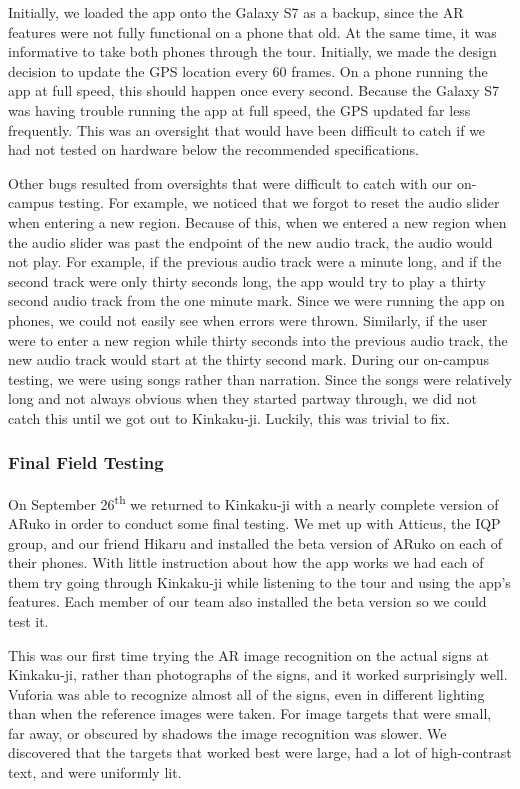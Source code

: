 \documentclass[a4paper, 10pt, american, titlepage]{article}
\begin{document}
Initially, we loaded the app onto the Galaxy S7 as a backup, since the AR
features were not fully functional on a phone that old. At the same time, it was
informative to take both phones through the tour. Initially, we made the design
decision to update the GPS location every 60 frames. On a phone running the app
at full speed, this should happen once every second. Because the Galaxy S7 was
having trouble running the app at full speed, the GPS updated far less
frequently. This was an oversight that would have been difficult to catch if we
had not tested on hardware below the recommended specifications.

Other bugs resulted from oversights that were difficult to catch with our
on-campus testing. For example, we noticed that we forgot to reset the audio
slider when entering a new region.  Because of this, when we entered a new
region when the audio slider was past the endpoint of the new audio track, the
audio would not play. For example, if the previous audio track were a minute
long, and if the second track were only thirty seconds long, the app would try
to play a thirty second audio track from the one minute mark. Since we were
running the app on phones, we could not easily see when errors were thrown.
Similarly, if the user were to enter a new region while thirty seconds into the
previous audio track, the new audio track would start at the thirty second
mark. During our on-campus testing, we were using songs rather than narration.
Since the songs were relatively long and not always obvious when they started
partway through, we did not catch this until we got out to Kinkaku-ji. Luckily,
this was trivial to fix.

\subsubsection{Final Field Testing}
\label{sec:finalFieldTesting}

On September 26\textsuperscript{th} we returned to Kinkaku-ji with a nearly
complete version of ARuko in order to conduct some final testing. We met up with
Atticus, the IQP group, and our friend Hikaru and installed the beta version of
ARuko on each of their phones. With little instruction about how the app works
we had each of them try going through Kinkaku-ji while listening to the tour and
using the app's features. Each member of our team also installed the beta
version so we could test it.

This was our first time trying the AR image recognition on the actual signs at
Kinkaku-ji, rather than photographs of the signs, and it worked surprisingly
well. Vuforia was able to recognize almost all of the signs, even in different
lighting than when the reference images were taken. For image targets that were
small, far away, or obscured by shadows the image recognition was slower. We
discovered that the targets that worked best were large, had a lot of
high-contrast text, and were uniformly lit.
\end{document}
